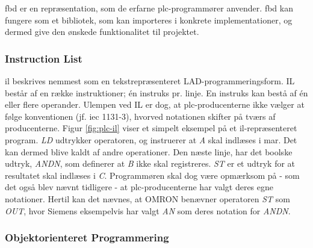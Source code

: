 
\noindent \gls{fbd} er en repræsentation, som de erfarne \gls{plc}-programmører anvender. \gls{fbd} kan fungere som et bibliotek, som kan importeres i konkrete implementationer, og dermed give den ønskede funktionalitet til projektet. \cite{FDB_desc}

\subsubsection{Instruction List}
\gls{il} beskrives nemmest som en tekstrepræsenteret LAD-programmeringsform. IL består af en række instruktioner; én instruks pr. linje. En instruks kan bestå af én eller flere operander. Ulempen ved IL er dog, at \gls{plc}-producenterne ikke vælger at følge konventionen (jf. \gls{iec} 1131-3), hvorved notationen skifter på tværs af producenterne. Figur \ref{fig:plc-il} viser et simpelt eksempel på et \gls{il}-repræsenteret program. \textit{LD} udtrykker operatoren, og instruerer at \textit{A} skal indlæses i \gls{mar}. Det kan dermed blive kaldt af andre operationer. Den næste linje, har det boolske udtryk, \textit{ANDN}, som definerer at \textit{B} ikke skal registreres. \textit{ST} er et udtryk for at resultatet skal indlæses i \textit{C}. Programmøren skal dog være opmærksom på - som det også blev nævnt tidligere - at \gls{plc}-producenterne har valgt deres egne notationer. Hertil kan det nævnes, at OMRON benævner operatoren \textit{ST} som \textit{OUT}, hvor Siemens eksempelvis har valgt \textit{AN} som deres notation for \textit{ANDN}. \cite{FDB_desc}


\subsubsection{Objektorienteret Programmering}
\label{subsec:software_codesys}

























